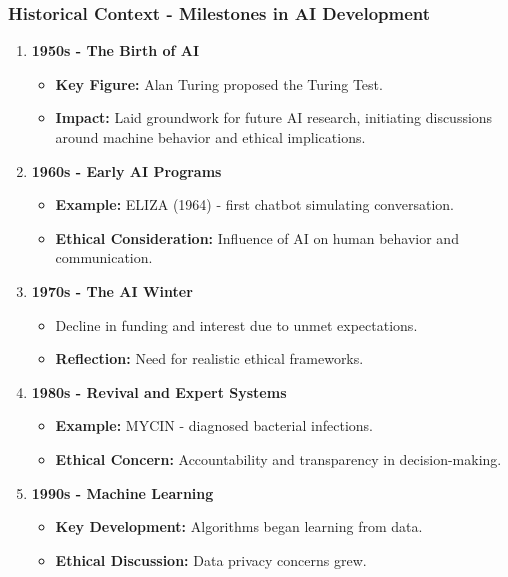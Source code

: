 \documentclass{beamer}
\begin{document}
\begin{frame}[fragile]
    \frametitle{Historical Context - Milestones in AI Development}
    \begin{enumerate}
        \item \textbf{1950s - The Birth of AI}
        \begin{itemize}
            \item \textbf{Key Figure:} Alan Turing proposed the Turing Test.
            \item \textbf{Impact:} Laid groundwork for future AI research, initiating discussions around machine behavior and ethical implications.
        \end{itemize}
        
        \item \textbf{1960s - Early AI Programs}
        \begin{itemize}
            \item \textbf{Example:} ELIZA (1964) - first chatbot simulating conversation.
            \item \textbf{Ethical Consideration:} Influence of AI on human behavior and communication.
        \end{itemize}
        
        \item \textbf{1970s - The AI Winter}
        \begin{itemize}
            \item Decline in funding and interest due to unmet expectations.
            \item \textbf{Reflection:} Need for realistic ethical frameworks.
        \end{itemize}
        
        \item \textbf{1980s - Revival and Expert Systems}
        \begin{itemize}
            \item \textbf{Example:} MYCIN - diagnosed bacterial infections.
            \item \textbf{Ethical Concern:} Accountability and transparency in decision-making.
        \end{itemize}

        \item \textbf{1990s - Machine Learning}
        \begin{itemize}
            \item \textbf{Key Development:} Algorithms began learning from data.
            \item \textbf{Ethical Discussion:} Data privacy concerns grew.
        \end{itemize}


\end{enumerate}
\end{frame}
\end{document}
